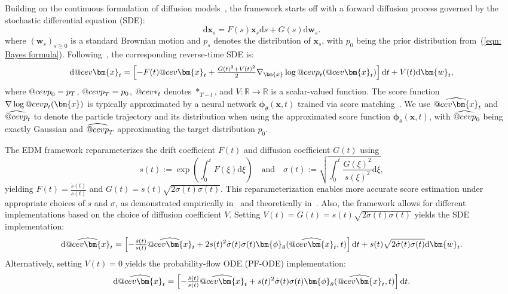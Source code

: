 \documentclass{article}
\makeatletter
\numberwithin{equation}{section}
\def\eqref#1{(\ref{#1})}
\newcommand{\dif}{{\mathrm{d}}}
\def\vw{{\bm{w}}}
\def\vx{{\bm{x}}}
\def\vphi{{\bm{\phi}}}
\DeclareRobustCommand{\cev}[1]{%
  {\mathpalette\do@cev{#1}}%
}
\newcommand{\do@cev}[2]{%
  \vbox{\offinterlineskip
    \sbox\z@{$\m@th#1 x$}%
    \ialign{##\cr
      \hidewidth\reflectbox{$\m@th#1\vec{}\mkern4mu$}\hidewidth\cr
      \noalign{\kern-\ht\z@}
      $\m@th#1#2$\cr
    }%
  }%
}
\makeatother
\begin{document}
Building on the continuous formulation of diffusion models~\cite{song2020score}, the framework starts off with a forward diffusion process governed by the stochastic differential equation (SDE):
\begin{equation}
\label{eqn: forward sde in standard dm}
\dif \vx_s = F(s)\vx_s\dif s + G(s)\dif \vw_s.
\end{equation}
where $(\vw_s)_{s\geq 0}$ is a standard Brownian motion and $p_s$ denotes the distribution of $\vx_s$, with $p_0$ being the prior distribution from~\eqref{eqn: Bayes formula}. Following~\cite{anderson1982reverse}, the corresponding reverse-time SDE is:
\begin{equation}
\label{eqn: backward sde in standard dm}
\dif \cev{\vx}_t = \left[-F(t)\cev{\vx}_t + \tfrac{G(t)^2 + V(t)^2}{2} \nabla_\vx \log \cev{p}_t(\cev{\vx}_t) \right]\dif t + V(t) \dif \vw_t,
\end{equation}
where $\cev{p}_0 = p_T$, $\cev{p}_T = p_0$, $\cev{\ast}_t$ denotes $\ast_{T-t}$, and $V:\mathbb{R} \rightarrow \mathbb{R}$ is a scalar-valued function. The score function $\nabla \log \cev{p}_t(\vx)$ is typically approximated by a neural network $\vphi_{\theta}(\vx,t)$ trained via score matching~\cite{hyvarinen2005estimation,vincent2011connection}. We use $\widehat{\cev{\vx}}_t$ and $\widehat{\cev{p}}_t$ to denote the particle trajectory and its distribution when using the approximated score function $\vphi_{\theta}(\vx,t)$, with $\widehat{\cev{p}}_0$ being exactly Gaussian and $\widehat{\cev{p}}_T$ approximating the target distribution $p_0$.

The EDM framework reparameterizes the drift coefficient $F(t)$ and diffusion coefficient $G(t)$ using
\begin{equation*}
s(t):=\exp\left(\int_{0}^{t}F(\xi)\dif\xi\right) \quad \text{and} \quad \sigma(t):= \sqrt{\int_{0}^{t}\frac{G(\xi)^2}{s(\xi)^2}\dif\xi},
\end{equation*}
yielding $F(t) = \frac{\dot{s}(t)}{s(t)}$ and $G(t) = s(t)\sqrt{2\dot{\sigma}(t)\sigma(t)}$. This reparameterization enables more accurate score estimation under appropriate choices of $s$ and $\sigma$, as demonstrated empirically in~\cite{karras2022elucidating} and theoretically in~\cite{wang2024evaluating}. Also, the framework allows for different implementations based on the choice of diffusion coefficient $V$. Setting $V(t)=G(t) = s(t)\sqrt{2\dot{\sigma}(t)\sigma(t)}$ yields the SDE implementation:
\begin{equation}
\label{eqn: EDM SDE}
\dif \widehat{\cev{\vx}}_t = \left[-\tfrac{\dot{s}(t)}{s(t)}\widehat{\cev{\vx}}_t + 2s(t)^2\dot{\sigma}(t)\sigma(t)\vphi_\theta(\widehat{\cev{\vx}}_t,t)\right]\dif t + s(t)\sqrt{2\dot{\sigma}(t)\sigma(t)}\dif \vw_t.    
\end{equation}
Alternatively, setting $V(t) =0$ yields the probability-flow ODE (PF-ODE) implementation:
\begin{equation}
\label{eqn: EDM PF-ODE}
\dif \widehat{\cev{\vx}}_t = \left[-\tfrac{\dot{s}(t)}{s(t)}\widehat{\cev{\vx}}_t + s(t)^2\dot{\sigma}(t)\sigma(t)\vphi_\theta(\widehat{\cev{\vx}}_t,t)\right]\dif t. 
\end{equation}
\end{document}

